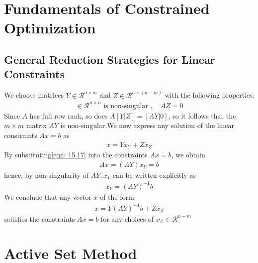 \documentclass[11pt]{article}
\begin{document}
    \section{Fundamentals of Constrained Optimization} \label{sec: chap15}
    \subsection{General Reduction Strategies for Linear Constraints} \label{subsec:-reduction-linear-constraints}
    We choose matrices $Y\in\mathcal{R}^{n\times m}$ and $Z\in\mathcal{R}^{n\times (n - m)}$
    with the following properties:
    \begin{align}
        [Y|Z]\in\mathcal{R}^{n\times n} \text{ is non-singular } , \quad AZ = 0 \tag{15.16}\label{chap15: partition}
    \end{align}
    Since $A$ has full row rank, so does $A[Y|Z] = [AY|0]$, so it follows that the $m\times m$ matrix $AY$
    is non-singular.We now express any solution of the linear constraints $Ax = b$ as
    \begin{align}
        x = Yx_Y + Zx_Z \tag{15.17}\label{eqn: 15.17}
    \end{align}
    By substituting\eqref{eqn: 15.17} into the constraints $Ax = b$, we obtain
    \begin{align*}
        Ax = (AY)x_Y = b
    \end{align*}
    hence, by non-singularity of $AY, x_Y$ can be written explicitly as
    \begin{align}
        x_Y = (AY)^{-1}b \tag{15.18}\label{eqn: 15.18}
    \end{align}
    We conclude that any vector $x$ of the form
    \begin{align}
        x = Y(AY)^{-1}b + Zx_Z \tag{15.19}\label{eqn: 15.19}
    \end{align}
    satisfies the constraints $Ax = b$ for any choices of $x_Z\in\mathcal{R}^{n-m}$
    \section{Active Set Method} \label{sec:asm}
    
\end{document}
